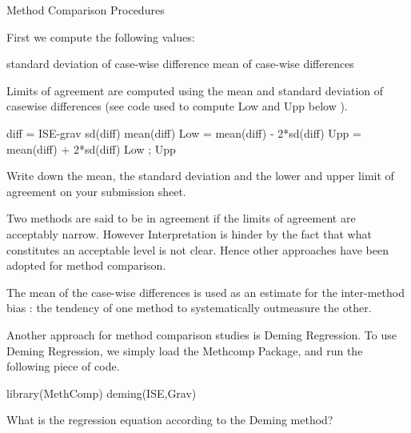Method Comparison Procedures

First we compute the following values:

standard deviation of case-wise difference
mean of case-wise differences 

Limits of agreement are computed using the mean and standard deviation of casewise differences (see code used to compute Low and Upp below ).

diff = ISE-grav
sd(diff)
mean(diff)
Low = mean(diff) - 2*sd(diff)
Upp = mean(diff) + 2*sd(diff)
Low ; Upp

Write down the mean, the standard deviation and the lower and upper limit of agreement on your submission sheet.

Two methods are said to be in agreement if the limits of agreement are acceptably narrow. However Interpretation is hinder by the fact that what constitutes an acceptable level is not clear. Hence other approaches have been adopted for method comparison.


The mean of the case-wise differences is used as an estimate for the inter-method bias : the tendency of one method to systematically outmeasure the other.

Another approach for method comparison studies is Deming Regression. To use Deming Regression, we simply load the Methcomp Package, and run the following piece of code.

library(MethComp)
deming(ISE,Grav)




What is the regression equation according to the Deming method?
